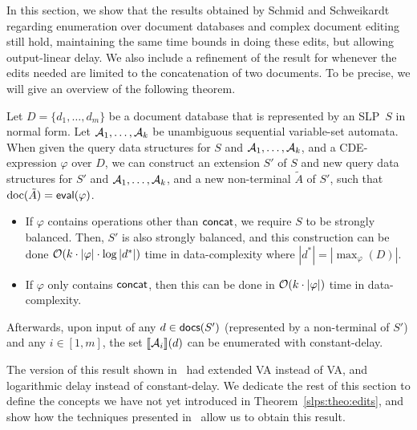 
In this section, we show that the results obtained by Schmid and Schweikardt~\cite{SchmidS22} regarding enumeration over document databases and complex document editing still hold, maintaining the same time bounds in doing these edits, but allowing output-linear delay. We also include a refinement of the result for whenever the edits needed are limited to the concatenation of two documents. To be precise, we will give an overview of the following theorem.

\begin{theorem}\label{slps:theo:edits}
	Let $D = \{d_1,\ldots,d_m\}$ be a document database that is represented by an SLP~$S$ in normal form. Let $\mathcal{A}_1,\ldots,\mathcal{A}_k$ be unambiguous sequential variable-set automata. When given the query data structures for $S$ and $\mathcal{A}_1,\ldots, \mathcal{A}_k$, and a CDE-expression $\varphi$ over $D$, we can construct an extension $S'$ of $S$ and new query data structures for $S'$ and $\mathcal{A}_1,\ldots,\mathcal{A}_k$, and a new non-terminal $\tilde{A}$ of $S'$, such that $\operatorname{doc}(\tilde{A}) = \textsf{eval}(\varphi)$. 
	\begin{itemize}
		\item If $\varphi$ contains operations other than $\textsf{concat}$, we require $S$ to be strongly balanced. Then, $S'$ is also strongly balanced, and this construction can be done $\mathcal{O}(k\cdot|\varphi|\cdot\log|d^*|)$ time in data-complexity where $|d^*| = |\max_{\varphi}(D)|$.
		\item If $\varphi$ only contains $\textsf{concat}$, then this can be done in $\mathcal{O}(k\cdot|\varphi|)$ time in data-complexity.
	\end{itemize}
	Afterwards, upon input of any $d\in\textsf{docs}(S')$ (represented by a non-terminal of $S'$) and any $i\in[1, m]$, the set ${\llbracket{\mathcal{A}_i}\rrbracket}(d)$ can be enumerated with constant-delay.
\end{theorem}

The version of this result shown in~\cite{SchmidS22} had extended VA instead of VA, and logarithmic delay instead of constant-delay.
We dedicate the rest of this section to define the concepts we have not yet introduced in Theorem~\ref{slps:theo:edits}, and show how the techniques presented in~\cite{SchmidS22} allow us to obtain this result. 

